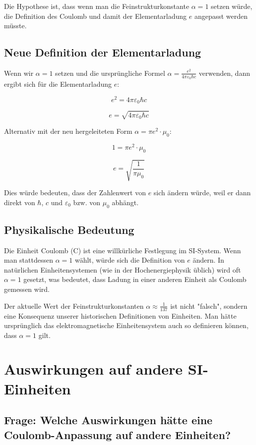 \documentclass{article}
\begin{document}
	Die Hypothese ist, dass wenn man die Feinstrukturkonstante $\alpha = 1$ setzen würde, die Definition des Coulomb und damit der Elementarladung $e$ angepasst werden müsste.
	
	\subsection{Neue Definition der Elementarladung}
	
	Wenn wir $\alpha = 1$ setzen und die ursprüngliche Formel $\alpha = \frac{e^2}{4\pi\varepsilon_0\hbar c}$ verwenden, dann ergibt sich für die Elementarladung $e$:
	
	$$e^2 = 4\pi\varepsilon_0\hbar c$$
	
	$$e = \sqrt{4\pi\varepsilon_0\hbar c}$$
	
	Alternativ mit der neu hergeleiteten Form $\alpha = \pi e^2 \cdot \mu_0$:
	
	$$1 = \pi e^2 \cdot \mu_0$$
	
	$$e = \sqrt{\frac{1}{\pi \mu_0}}$$
	
	Dies würde bedeuten, dass der Zahlenwert von $e$ sich ändern würde, weil er dann direkt von $\hbar$, $c$ und $\varepsilon_0$ bzw. von $\mu_0$ abhängt.
	
	\subsection{Physikalische Bedeutung}
	
	Die Einheit Coulomb (C) ist eine willkürliche Festlegung im SI-System. Wenn man stattdessen $\alpha = 1$ wählt, würde sich die Definition von $e$ ändern. In natürlichen Einheitensystemen (wie in der Hochenergiephysik üblich) wird oft $\alpha = 1$ gesetzt, was bedeutet, dass Ladung in einer anderen Einheit als Coulomb gemessen wird.
	
	Der aktuelle Wert der Feinstrukturkonstanten $\alpha \approx \frac{1}{137}$ ist nicht "falsch", sondern eine Konsequenz unserer historischen Definitionen von Einheiten. Man hätte ursprünglich das elektromagnetische Einheitensystem auch so definieren können, dass $\alpha = 1$ gilt.
	
	\section{Auswirkungen auf andere SI-Einheiten}
	
	\subsection{Frage: Welche Auswirkungen hätte eine Coulomb-Anpassung auf andere Einheiten?}
	
\end{document}
